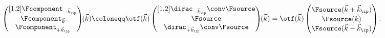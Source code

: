 \begin{equation}
    \begin{pmatrix}[1.2]
       \Fcomponent_{-\vec{k}_\ip} \\
       \Fcomponent_{\vec{0}} \\
       \Fcomponent_{+\vec{k}_\ip} \\
   \end{pmatrix}\hspace{-0.3em}(\vec{k}) \coloneqq
   \otf(\vec{k}) \begin{pmatrix}[1.2]
        \dirac_{-\vec{k}_\ip} \conv \Fsource \\
        \Fsource \\
        \dirac_{+\vec{k}_\ip} \conv \Fsource \\
    \end{pmatrix}\hspace{-0.3em}(\vec{k}) =
     \otf(\vec{k}) \begin{pmatrix}
        \Fsource(\vec{k} + \vec{k}_\ip) \\
        \Fsource(\vec{k})  \\
        \Fsource(\vec{k} - \vec{k}_\ip)  \\
    \end{pmatrix}.
\end{equation}

